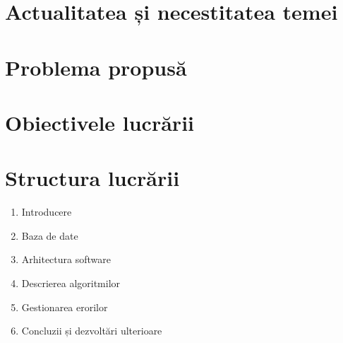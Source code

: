 \label{cap1}


\label{Chapter1} %

\thispagestyle{fancy}


\section{Actualitatea și necestitatea temei} 

\section{Problema propusă} 

\section{Obiectivele lucrării} 

\section{Structura lucrării} 
	\begin{enumerate}
	 \setlength\itemsep{0em}
		\item Introducere
	    \item Baza de date
		\item Arhitectura software
		\item Descrierea algoritmilor
		\item Gestionarea erorilor
		\item Concluzii și dezvoltări ulterioare
	\end{enumerate}